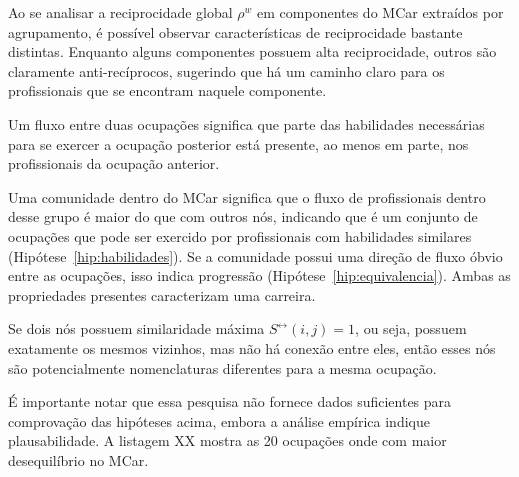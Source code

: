\documentclass[12pt,a4paper,final]{article}
\newcommand{\linkboth}[1]{#1^\leftrightarrow} %
\newcommand{\weighted}[1]{#1^w} %
\begin{document}
Ao se analisar a reciprocidade global $\weighted{\rho}$ em componentes do MCar extraídos por agrupamento, é possível observar características de reciprocidade bastante distintas. Enquanto alguns componentes possuem alta reciprocidade, outros são claramente anti-recíprocos, sugerindo que há um caminho claro para os profissionais que se encontram naquele componente.

\begin{hypothesis} \label{hip:habilidades}
    Um fluxo entre duas ocupações significa que parte das habilidades necessárias para se exercer a ocupação posterior está presente, ao menos em parte, nos profissionais da ocupação anterior.
\end{hypothesis}

\begin{hypothesis}
    Uma comunidade dentro do MCar significa que o fluxo de profissionais dentro desse grupo é maior do que com outros nós, indicando que é um conjunto de ocupações que pode ser exercido por profissionais com habilidades similares (Hipótese~\ref{hip:habilidades}). Se a comunidade possui uma direção de fluxo óbvio entre as ocupações, isso indica progressão (Hipótese~\ref{hip:equivalencia}). Ambas as propriedades presentes caracterizam uma carreira.
\end{hypothesis}

\begin{hypothesis}
    Se dois nós possuem similaridade máxima $\linkboth{S}(i,j) = 1$, ou seja, possuem exatamente os mesmos vizinhos, mas não há conexão entre eles, então esses nós são potencialmente nomenclaturas diferentes para a mesma ocupação.
\end{hypothesis}

É importante notar que essa pesquisa não fornece dados suficientes para comprovação das hipóteses acima, embora a análise empírica indique plausabilidade. A listagem XX mostra as 20 ocupações onde com maior desequilíbrio no MCar.
\end{document}
